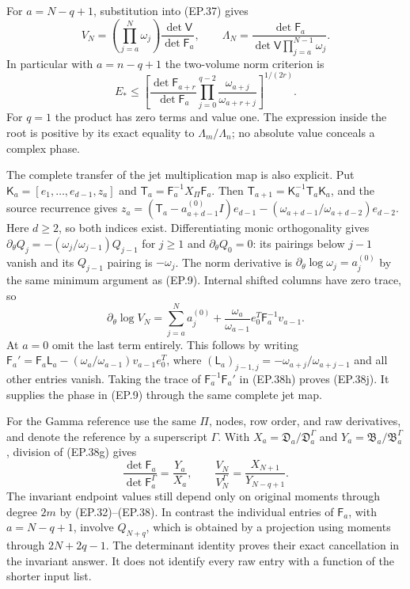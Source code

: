 \documentclass[11pt]{article}
\begin{document}
For $a=N-q+1$, substitution into (EP.37) gives
\[
 V_N=\left(\prod_{j=a}^{N}\omega_j\right)
 \frac{\det\mathsf V}{\det\mathsf F_a},\qquad
 \Lambda_N=\frac{\det\mathsf F_a}
 {\det\mathsf V\prod_{j=a}^{N-1}\omega_j}.\tag{EP.38h}
\]
In particular with $a=n-q+1$ the two-volume norm criterion is
\[
 \boxed{E_*\le
 \left[\frac{\det\mathsf F_{a+r}}{\det\mathsf F_a}
 \prod_{j=0}^{q-2}\frac{\omega_{a+j}}{\omega_{a+r+j}}
 \right]^{1/(2r)}.}\tag{EP.38i}
\]
For $q=1$ the product has zero terms and value one. The expression
inside the root is positive by its exact equality to
$\Lambda_m/\Lambda_n$; no absolute value conceals a complex phase.

The complete transfer of the jet multiplication map is also explicit.
Put $\mathsf K_a=[e_1,\ldots,e_{d-1},z_a]$ and
$\mathsf T_a=\mathsf F_a^{-1}X_\Pi\mathsf F_a$. Then
$\mathsf T_{a+1}=\mathsf K_a^{-1}\mathsf T_a\mathsf K_a$,
and the source recurrence gives
$z_a=(\mathsf T_a-a_{a+d-1}^{(0)}I)e_{d-1}
-(\omega_{a+d-1}/\omega_{a+d-2})e_{d-2}$.
Here $d\ge2$, so both indices exist. Differentiating monic
orthogonality gives
$\partial_\theta Q_j=-(\omega_j/\omega_{j-1})Q_{j-1}$ for $j\ge1$
and $\partial_\theta Q_0=0$:
its pairings below $j-1$ vanish and its $Q_{j-1}$ pairing is
$-\omega_j$. The norm derivative is
$\partial_\theta\log\omega_j=a_j^{(0)}$ by the same minimum
argument as (EP.9). Internal shifted columns have zero trace, so
\[
 \partial_\theta\log V_N
 =\sum_{j=a}^{N}a_j^{(0)}
 +\frac{\omega_a}{\omega_{a-1}}
 e_0^T\mathsf F_a^{-1}v_{a-1}.\tag{EP.38j}
\]
At $a=0$ omit the last term entirely. This follows by writing
$\mathsf F_a'=\mathsf F_a\mathsf L_a
-(\omega_a/\omega_{a-1})v_{a-1}e_0^T$, where
$(\mathsf L_a)_{j-1,j}=-\omega_{a+j}/\omega_{a+j-1}$ and
all other entries vanish. Taking the trace of
$\mathsf F_a^{-1}\mathsf F_a'$ in (EP.38h) proves (EP.38j).
It supplies the phase in (EP.9) through the same complete jet map.

For the Gamma reference use the same $\Pi$, nodes, row order, and
raw derivatives, and denote the reference by a superscript $\Gamma$.
With $X_a=\mathfrak D_a/\mathfrak D_a^\Gamma$ and
$Y_a=\mathfrak B_a/\mathfrak B_a^\Gamma$, division of (EP.38g) gives
\[
 \frac{\det\mathsf F_a}{\det\mathsf F_a^\Gamma}=\frac{Y_a}{X_a},
 \qquad \frac{V_N}{V_N^\Gamma}=\frac{X_{N+1}}{Y_{N-q+1}}.
\tag{EP.38k}
\]
The invariant endpoint values still depend only on original moments
through degree $2m$ by (EP.32)--(EP.38). In contrast the individual
entries of $\mathsf F_a$, with $a=N-q+1$, involve $Q_{N+q}$,
which is obtained by a projection using moments through $2N+2q-1$.
The determinant identity proves their exact cancellation in the
invariant answer. It does not identify every raw entry with a function
of the shorter input list.
\end{document}
